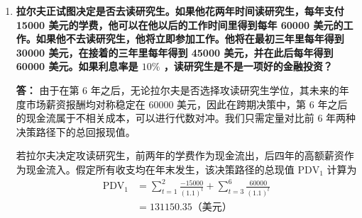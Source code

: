 \begin{enumerate}[label=\textbf{\arabic*.}, leftmargin=*]
		针对第四种情况，该彩票属于首期立即支付的即付年金组合。将未来 20 年每年流入的 50000 美元全部折现，为了防止公式溢出，将其切分为多行表达
		\[
		\begin{aligned}
			\text{PDV} &= \sum_{t=0}^{19} \frac{50000}{(1+0.05)^t} \\
			&= 50000 \times \left[ \frac{1 - (1.05)^{-20}}{0.05} \right] \times 1.05 \\
			&= 654266.04 \text{（美元）}
		\end{aligned}
		\]
		
		针对第五种情况，无限期发放且可继承的年金在数理上构成了一笔永续年金资产。该永续年金流在当期所对应的总资产现值可以通过如下公式求得
		\[
		\text{PDV}_{\text{永续}} = \frac{W}{R} = \frac{60000}{0.05} = 1200000 \text{（美元）}
		\]
		由于永续年金的总折现价值显著高于直接结算的当期现金（$1200000 > 1000000$），因此应当选择每年拿 60000 美元。
		
		针对第六种情况，免息贷款实质上充当了规避赠予税的隐性财富转移工具。如果父母希望向孩子进行一笔数额为 $N$ 的隐性免税赠予，只需向孩子提供一笔数额为 $L$ 的大额无息贷款，其数理对应关系为
		\[
		L = \frac{N(1+R)}{R}
		\]
		孩子将这笔资金存入市场获取利息，即可在期末无税获得相当于 $N$ 的财富变现。
		
		例如，若想免税转移 50000 美元，富裕家庭只需无息借给孩子 1050000 美元即可。由于这种高额资金拆借需要极强的流动性支持，普通低收入家庭根本无法利用该漏洞。因此，这一规则对普通薪资家庭是不公平的，实质上恶化了阶层间的财富代际分配。
		
		\item \textbf{拉尔夫正试图决定是否去读研究生。如果他花两年时间读研究生，每年支付 15000 美元的学费，他可以在他以后的工作时间里得到每年 60000 美元的工作。如果他不去读研究生，他将立即参加工作。他将在最初三年里每年得到 30000 美元，在接着的三年里每年得到 45000 美元，并在此后每年得到 60000 美元。如果利息率是 $10\%$ ，读研究生是不是一项好的金融投资？}
		
		\textbf{答：}
		由于在第 6 年之后，无论拉尔夫是否选择攻读研究生学位，其未来的年度市场薪资报酬均对称稳定在 60000 美元，因此在跨期决策中，第 6 年之后的现金流属于不相关成本，可以进行代数对冲。我们只需定量对比前 6 年两种决策路径下的总回报现值。
		
		若拉尔夫决定攻读研究生，前两年的学费作为现金流出，后四年的高额薪资作为现金流入。假定所有收支均在年末发生，该决策路径的总现值 $\text{PDV}_1$ 计算为
		\[
		\begin{aligned}
			\text{PDV}_1 &= \sum_{t=1}^2 \frac{-15000}{(1.1)^t} + \sum_{t=3}^6 \frac{60000}{(1.1)^t} \\
			&= 131150.35 \text{（美元）}
		\end{aligned}
		\]
		

\end{enumerate}
